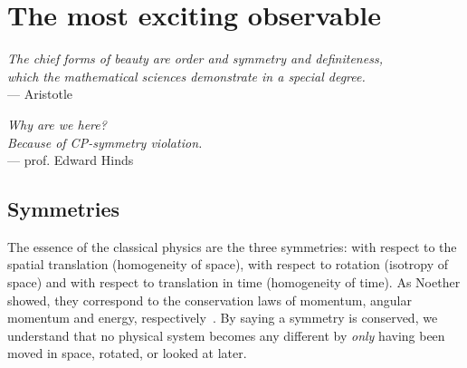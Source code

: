\chapter{The most exciting observable}
\label{ch:nedm-at-psi}




\begin{flushright}{\slshape    
  The chief forms of beauty are order and symmetry and definiteness,\\
  which the mathematical sciences demonstrate in a special degree.} \\ \medskip
--- Aristotle
\end{flushright}

\bigskip

\begin{flushright}{\slshape    
  Why are we here?\\
  Because of CP-symmetry violation.} \\ \medskip
--- prof. Edward Hinds
\end{flushright}

\bigskip

\section{Symmetries}


The essence of the classical physics are the three symmetries: with respect to the spatial translation (homogeneity of space), with respect to rotation (isotropy of space) and with respect to translation in time (homogeneity of time). As Noether showed, they correspond to the conservation laws of momentum, angular momentum and energy, respectively~\cite{Noether1918}. By saying a symmetry is conserved, we understand that no physical system becomes any different by \emph{only} having been moved in space, rotated, or looked at later.

